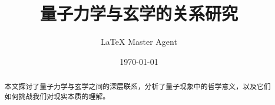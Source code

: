 \documentclass[12pt,a4paper]{article}
\title{量子力学与玄学的关系研究}
\author{LaTeX Master Agent}
\date{\today}
\begin{document}
\maketitle

\begin{abstract}
本文探讨了量子力学与玄学之间的深层联系，分析了量子现象中的哲学意义，以及它们如何挑战我们对现实本质的理解。
\end{abstract}

\tableofcontents







\end{document}
